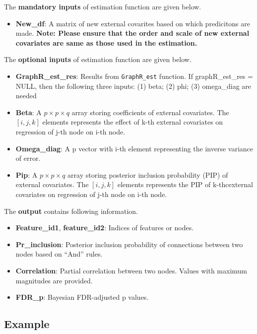 \documentclass[
]{book}
\providecommand{\tightlist}{%
  \setlength{\itemsep}{0pt}\setlength{\parskip}{0pt}}
\begin{document}
The \textbf{mandatory inputs} of estimation function are given below.

\begin{itemize}
\tightlist
\item
  \textbf{New\_df}: A matrix of new external covarites based on which predicitons are made. \textbf{Note: Please ensure that the order and scale of new external covariates are same as those used in the estimation.}
\end{itemize}

The \textbf{optional inputs} of estimation function are given below.

\begin{itemize}
\item
  \textbf{GraphR\_est\_res}: Results from \texttt{GraphR\_est} function. If graphR\_est\_res = NULL, then the following three inputs: (1) beta; (2) phi; (3) omega\_diag are needed
\item
  \textbf{Beta}: A \(p \times p \times q\) array storing coefficients of external covariates. The \([i,j,k]\) elements represents the effect of k-th external covariates on regression of j-th node on i-th node.
\item
  \textbf{Omega\_diag}: A p vector with i-th element representing the inverse variance of error.
\item
  \textbf{Pip}: A \(p \times p \times q\) array storing posterior inclusion probability (PIP) of external covariates. The \([i,j,k]\) elements represents the PIP of k-thcexternal covariates on regression of j-th node on i-th node.
\end{itemize}

The \textbf{output} contains following information.

\begin{itemize}
\item
  \textbf{Feature\_id1}, \textbf{feature\_id2}: Indices of features or nodes.
\item
  \textbf{Pr\_inclusion}: Posterior inclusion probability of connections between two nodes
  based on ``And'' rules.
\item
  \textbf{Correlation}: Partial correlation between two nodes. Values with maximum magnitudes are provided.
\item
  \textbf{FDR\_p}: Bayesian FDR-adjusted p values.
\end{itemize}

\hypertarget{example}{%
\subsection{Example}\label{example}}
\end{document}
